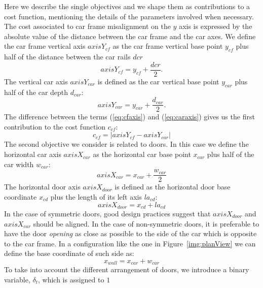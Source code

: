 Here we describe the single objectives and we shape them as 
contributions to a cost function, mentioning the details of the 
parameters involved when necessary.  
The cost associated to car frame misalignment on the $y$ axis is 
expressed by the absolute value of the distance between the car frame
and the car axes. We define the car frame vertical axis $axisY_{cf}$ as 
the car frame vertical base point $y_{cf}$ plus half of the distance
between the car rails $dcr$
\begin{equation}
	\label{eq:cfaxis}
	axisY_{cf} = y_{cf} + \frac{dcr}{2}.
\end{equation}
The vertical car axis $axisY_{car}$ is defined as the car vertical base
point $y_{car}$ plus half of the car depth $d_{car}$: 
\begin{equation}
	\label{eq:caraxis}
	axisY_{car} = y_{car} + \frac{d_{car}}{2}.
\end{equation}
The difference between the terms (\ref{eq:cfaxis}) and
(\ref{eq:caraxis}) gives us the first contribution to the cost
function $c_{cf}$: 
\begin{equation}
	\label{eq:costoh}
	c_{cf} = |axisY_{cf} - axisY_{car}|
\end{equation} 
The second objective we consider is related to doors. In this case
we define the horizontal car axis $axisX_{car}$ as the horizontal car
base point $x_{car}$ plus half of the car width $w_{car}$:
\begin{equation}
	\label{eq:caraxis2}
	axisX_{car} = x_{car} + \frac{w_{car}}{2}
\end{equation}
The horizontal door axis $axisX_{door}$ is defined as the horizontal
door base coordinate $x_{cd}$ plus the length of its left axis $la_{cd}$:
\begin{equation}
	\label{eq:axisd}
	axisX_{door} = x_{cd} + la_{cd} 
\end{equation}
In the case of symmetric doors, good design practices suggest that 
$axisX_{door}$ and $axisX_{car}$ should be aligned. In the case of 
non-symmetric doors, it is preferable to have the door \textit{opening} 
as close as possible to the side of the car which is opposite to the 
car frame.
In a configuration like the one in Figure~\ref{img:planView}
we can define the base coordinate of such side as:
\begin{equation}
	\label{eq:xwall}
	x_{wall} = x_{car} + w_{car}
\end{equation}
To take into account the different arrangement of doors, we
introduce a binary variable, $\delta_{t}$, which is assigned to $1$
